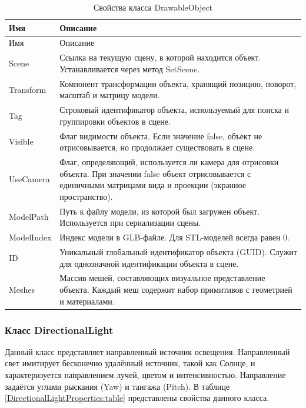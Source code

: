 \begin{xltabular}{\textwidth}{|>{\raggedright\arraybackslash}p{5cm}|>{\raggedright\arraybackslash}X|}
	\caption{Свойства класса DrawableObject\label{DrawableObject2:table}}\\ \hline
	\centrow Имя & \centrow Описание \\ \hline
	\endfirsthead
	\centrow Имя & \centrow Описание \\ \hline 
	\finishhead
	Scene & Ссылка на текущую сцену, в которой находится объект. Устанавливается через метод SetScene. \\
	\hline
	Transform & Компонент трансформации объекта, хранящий позицию, поворот, масштаб и матрицу модели. \\
	\hline
	Tag & Строковый идентификатор объекта, используемый для поиска и группировки объектов в сцене. \\
	\hline
	Visible & Флаг видимости объекта. Если значение false, объект не отрисовывается, но продолжает существовать в сцене. \\
	\hline
	UseCamera & Флаг, определяющий, используется ли камера для отрисовки объекта. При значении false объект отрисовывается с единичными матрицами вида и проекции (экранное пространство). \\
	\hline
	ModelPath & Путь к файлу модели, из которой был загружен объект. Используется при сериализации сцены. \\
	\hline
	ModelIndex & Индекс модели в GLB-файле. Для STL-моделей всегда равен 0. \\
	\hline
	ID & Уникальный глобальный идентификатор объекта (GUID). Служит для однозначной идентификации объекта в сцене. \\
	\hline
	Meshes & Массив мешей, составляющих визуальное представление объекта. Каждый меш содержит набор примитивов с геометрией и материалами.
\end{xltabular}

\subsubsection{Класс DirectionalLight}
Данный класс представляет направленный источник освещения. Направленный свет имитирует бесконечно удалённый источник, такой как Солнце, и характеризуется направлением лучей, цветом и интенсивностью. Направление задаётся углами рыскания (Yaw) и тангажа (Pitch). В таблице \ref{DirectionalLightProperties:table} представлены свойства данного класса.


